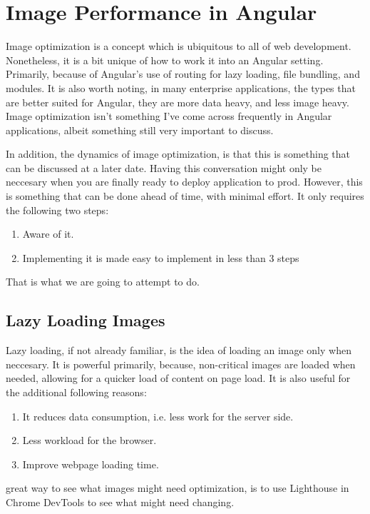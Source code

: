 \chapter{ Image Performance in Angular }

Image optimization is a concept which is ubiquitous to all of web development.
Nonetheless, it is a bit unique of how to work it into an Angular setting. Primarily, because of Angular's use of routing for lazy loading, file bundling, and modules. It is also worth noting, in many enterprise applications, the types that are better suited for Angular, they are more data heavy, and 
less image heavy. Image optimization isn't something I've come across frequently in Angular applications, albeit something still very important to discuss. 

In addition, the dynamics of image optimization, is that this is something that can be discussed at a later date. Having this conversation might only be neccesary when you are finally ready to deploy application to prod. However, this is something that can be done ahead of time, with minimal effort. It only requires the following two steps: 
\begin{enumerate}
  \item Aware of it. 
  \item Implementing it is made easy to implement in less than 3 steps
\end{enumerate}

That is what we are going to attempt to do. 

\section{Lazy Loading Images}
Lazy loading, if not already familiar, is the idea of loading an image only
when neccesary. It is powerful primarily, because, non-critical images are 
loaded when needed, allowing for a quicker load of content on page load. It 
is also useful for the additional following reasons: 
\begin{enumerate}
  \item It reduces data consumption, i.e. less work for the server side.
  \item Less workload for the browser. 
  \item Improve webpage loading time.
\end{enumerate}

great way to see what images might need optimization, is to use Lighthouse 
in Chrome DevTools to see what might need changing. 

